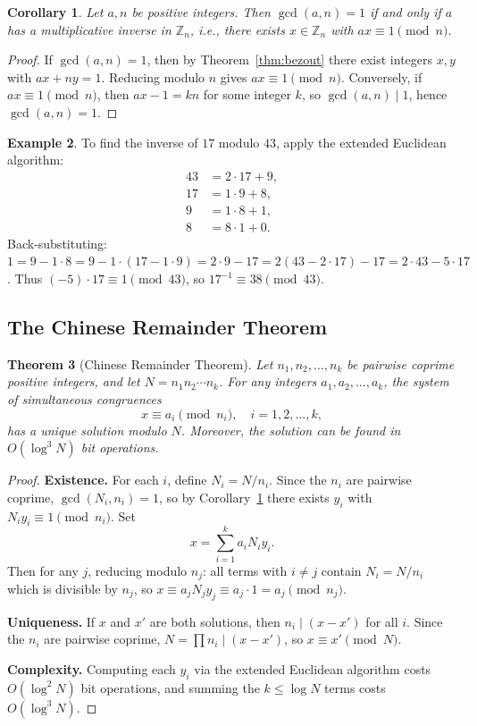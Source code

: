 \documentclass[twoside,12pt]{book}
\theoremstyle{plain}
\newtheorem{theorem}{Theorem}[chapter]
\newtheorem{corollary}[theorem]{Corollary}
\theoremstyle{definition}
\newtheorem{example}[theorem]{Example}
\theoremstyle{remark}
\begin{document}
\begin{corollary}
\label{cor:inverse}
Let $a, n$ be positive integers. Then $\gcd(a, n) = 1$ if and only if $a$ has a multiplicative inverse in $\mathbb{Z}_n$, i.e., there exists $x \in \mathbb{Z}_n$ with $ax \equiv 1 \pmod{n}$.
\end{corollary}

\begin{proof}
If $\gcd(a, n) = 1$, then by Theorem~\ref{thm:bezout} there exist integers $x, y$ with $ax + ny = 1$. Reducing modulo $n$ gives $ax \equiv 1 \pmod{n}$. Conversely, if $ax \equiv 1 \pmod{n}$, then $ax - 1 = kn$ for some integer $k$, so $\gcd(a, n) \mid 1$, hence $\gcd(a, n) = 1$.
\end{proof}

\begin{example}
To find the inverse of $17$ modulo $43$, apply the extended Euclidean algorithm:
\begin{align*}
43 &= 2 \cdot 17 + 9, \\
17 &= 1 \cdot 9 + 8, \\
9 &= 1 \cdot 8 + 1, \\
8 &= 8 \cdot 1 + 0.
\end{align*}
Back-substituting: $1 = 9 - 1 \cdot 8 = 9 - 1 \cdot (17 - 1 \cdot 9) = 2 \cdot 9 - 17 = 2(43 - 2 \cdot 17) - 17 = 2 \cdot 43 - 5 \cdot 17$. Thus $(-5) \cdot 17 \equiv 1 \pmod{43}$, so $17^{-1} \equiv 38 \pmod{43}$.
\end{example}

\subsection{The Chinese Remainder Theorem}

\begin{theorem}[Chinese Remainder Theorem]
\label{thm:crt}
Let $n_1, n_2, \ldots, n_k$ be pairwise coprime positive integers, and let $N = n_1 n_2 \cdots n_k$. For any integers $a_1, a_2, \ldots, a_k$, the system of simultaneous congruences
\[
x \equiv a_i \pmod{n_i}, \quad i = 1, 2, \ldots, k,
\]
has a unique solution modulo $N$. Moreover, the solution can be found in $O(\log^3 N)$ bit operations.
\end{theorem}

\begin{proof}
\textbf{Existence.} For each $i$, define $N_i = N / n_i$. Since the $n_i$ are pairwise coprime, $\gcd(N_i, n_i) = 1$, so by Corollary~\ref{cor:inverse} there exists $y_i$ with $N_i y_i \equiv 1 \pmod{n_i}$. Set
\[
x = \sum_{i=1}^{k} a_i N_i y_i.
\]
Then for any $j$, reducing modulo $n_j$: all terms with $i \neq j$ contain $N_i = N / n_i$ which is divisible by $n_j$, so $x \equiv a_j N_j y_j \equiv a_j \cdot 1 = a_j \pmod{n_j}$.

\textbf{Uniqueness.} If $x$ and $x'$ are both solutions, then $n_i \mid (x - x')$ for all $i$. Since the $n_i$ are pairwise coprime, $N = \prod n_i \mid (x - x')$, so $x \equiv x' \pmod{N}$.

\textbf{Complexity.} Computing each $y_i$ via the extended Euclidean algorithm costs $O(\log^2 N)$ bit operations, and summing the $k \leq \log N$ terms costs $O(\log^3 N)$.
\end{proof}
\end{document}
